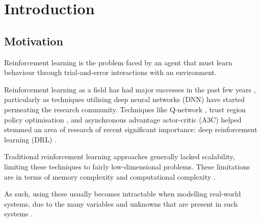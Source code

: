 
\chapter{Introduction} %
\label{Chapter1} %


\newcommand{\keyword}[1]{\textbf{#1}}
\newcommand{\tabhead}[1]{\textbf{#1}}
\newcommand{\code}[1]{\texttt{#1}}
\newcommand{\file}[1]{\texttt{\bfseries#1}}
\newcommand{\option}[1]{\texttt{\itshape#1}}


\section{Motivation}
\label{motivation}

Reinforcement learning is the problem faced by an agent that must learn behaviour through trial-and-error interactions with an environment.

Reinforcement learning as a field has had major successes in the past few years \parencite{tesauro1995temporal, singh2002optimizing, kohl2004policy, ng2006autonomous}, particularly as techniques utilising deep neural networks (DNN) have started permeating the research community. Techniques like Q-network \parencite{mnih2015human}, trust region policy optimisation \parencite{schulman2015trust}, and asynchronous advantage actor-critic (A3C) \parencite{mnih2016asynchronous} helped stemmed an area of research of recent significant importance: deep reinforcement learning (DRL) \parencite{DBLP:journals/corr/abs-1708-05866}.

Traditional reinforcement learning approaches generally lacked scalability, limiting these techniques to fairly low-dimensional problems. These limitations are in terms of memory complexity and computational complexity \parencite{kaelbling1996reinforcement}.

As such, using these usually becomes intractable when modelling real-world systems, due to the many variables and unknowns that are present in such systems \parencite{strehl2006pac}.

